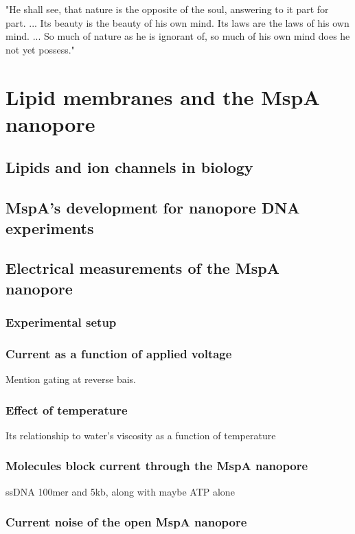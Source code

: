 \begin{savequote}[75mm]
"He shall see, that nature is the opposite of the soul, answering to it part for part. ... Its beauty is the beauty of his own mind. Its laws are the laws of his own mind. ... So much of nature as he is ignorant of, so much of his own mind does he not yet possess."
\end{savequote}

\chapter{Lipid membranes and the MspA nanopore}
\label{2_lipids_mspa}

\section{Lipids and ion channels in biology}

\section{MspA's development for nanopore DNA experiments}

\section{Electrical measurements of the MspA nanopore}

\subsection{Experimental setup}

\subsection{Current as a function of applied voltage}

Mention gating at reverse bais.

\subsection{Effect of temperature}

Its relationship to water's viscosity as a function of temperature

\subsection{Molecules block current through the MspA nanopore}

ssDNA 100mer and 5kb, along with maybe ATP alone

\subsection{Current noise of the open MspA nanopore}